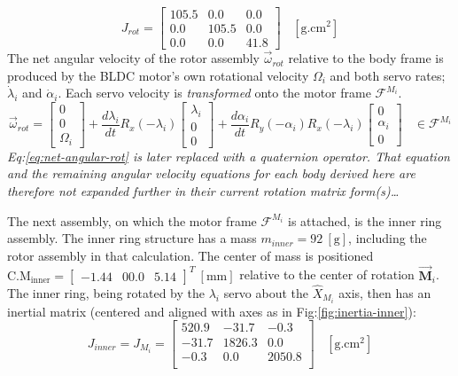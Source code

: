 \begin{equation}
J_{rot}=\begin{bmatrix}
105.5 & 0.0 & 0.0\\
0.0 & 105.5 & 0.0\\
0.0 & 0.0 & 41.8
\end{bmatrix}~~~~[\text{g.cm}^2]
\end{equation}
The net angular velocity of the rotor assembly $\vec{\omega}_{rot}$ relative to the body frame is produced by the BLDC motor's own rotational velocity $\Omega_i$ and both servo rates; $\dot{\lambda}_i$ and $\dot{\alpha}_i$. Each servo velocity is \emph{transformed} onto the motor frame $\mathcal{F}^{M_i}$.
\newpage
\begin{equation}\label{eq:net-angular-rot}
\vec{\omega}_{rot}=\begin{bmatrix}
0\\
0\\
\Omega_i
\end{bmatrix}
+\frac{d\lambda_i}{dt}R_x(-\lambda_i)\begin{bmatrix}
\lambda_i\\
0\\
0
\end{bmatrix}+\frac{d\alpha_i}{dt}R_y(-\alpha_i)R_x(-\lambda_i)\begin{bmatrix}
0\\
\alpha_i\\
0
\end{bmatrix}~~~~\in\mathcal{F}^{M_i}
\end{equation}
\emph{\color{gray} Eq:\ref{eq:net-angular-rot} is later replaced with a quaternion operator. That equation and the remaining angular velocity equations for each body derived here are therefore not expanded further in their current rotation matrix form(s)\ldots}
\par
The next assembly, on which the motor frame $\mathcal{F}^{M_i}$ is attached, is the inner ring assembly. The inner ring structure has a mass $m_{inner}=92~[\text{g}]$, including the rotor assembly in that calculation. The center of mass is positioned $\text{C.M}_{\text{inner}}=\begin{bmatrix}-1.44&00.0&5.14\end{bmatrix}^T~[\text{mm}]$ relative to the center of rotation $\vec{\mathbf{M}}_i$. The inner ring, being rotated by the $\lambda_i$ servo about the $\hat{X}_{M_i}$ axis, then has an inertial matrix (centered and aligned with axes as in Fig:\ref{fig:inertia-inner}):
\begin{equation} \label{eq:inertia.inner}
J_{inner}=J_{M_i}=\begin{bmatrix}
520.9 & -31.7	& -0.3\\
-31.7 & 1826.3 & 0.0\\
-0.3 & 0.0	& 2050.8\\
\end{bmatrix}~~~~[\text{g.cm}^2]
\end{equation}
